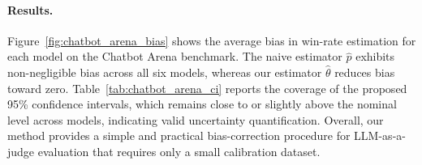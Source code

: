 \begin{table}[t!]
\centering
\caption{
Existing bias-correction estimators for $\E_{\sP}[\vZ]$.
Here, $\sP$ denotes the test distribution and $\sQ$ the calibration distribution. Estimators (ii)–(iv) rely on the assumption that $\Pr_{\sP}(\vZ)=\Pr_{\sQ}(\vZ)$, whereas our estimator in (v) remains valid when $\Pr_{\sP}(\vZ)\neq \Pr_{\sQ}(\vZ)$.
}
\label{tab:estimator-comparison}
\end{table}

\paragraph{Results.}
Figure~\ref{fig:chatbot_arena_bias} shows the average bias in win-rate estimation for each model on the Chatbot Arena benchmark. The naive estimator $\hat{p}$ exhibits non-negligible bias across all six models, whereas our estimator $\hat{\theta}$ reduces bias toward zero. Table~\ref{tab:chatbot_arena_ci} reports the coverage of the proposed 95\% confidence intervals, which remains close to or slightly above the nominal level across models, indicating valid uncertainty quantification. Overall, our method provides a simple and practical bias-correction procedure for LLM-as-a-judge evaluation that requires only a small calibration dataset.


